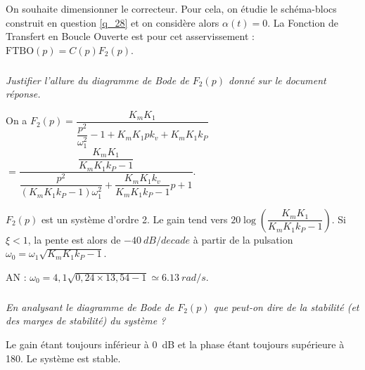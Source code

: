 \documentclass[10pt,fleqn]{article} %
\begin{document}
On souhaite dimensionner le correcteur. Pour cela, on étudie le schéma-blocs construit en question \ref{q_28} et on considère alors $\alpha(t)=0$. La Fonction de Transfert en Boucle Ouverte est pour cet asservissement : $\text{FTBO}(p)=C(p)F_2(p)$.

\subparagraph{\label{q_29}}\textit{Justifier l'allure du diagramme de Bode de $F_2(p)$ donné sur le document réponse.}
\ifprof
\begin{corrige}
On a $F_2(p)= \dfrac{K_m K_1}{\dfrac{p^2}{\omega_1^2}-1+K_m K_1pk_v+K_m K_1k_P}$
$ = \dfrac{\dfrac{K_m K_1}{K_m K_1k_P-1}}{\dfrac{p^2}{\left(K_m K_1k_P-1\right)\omega_1^2}+\dfrac{K_m K_1k_v}{K_m K_1k_P-1}p+1}$.

$F_2(p)$ est un système d'ordre 2. 
Le gain tend vers $20\log \left(\dfrac{K_m K_1}{K_m K_1k_P-1}\right)$. Si $\xi<1$, la pente est alors 
de $-\SI{40}{dB/decade}$ à partir de la pulsation $\omega_0 = \omega_1\sqrt{K_m K_1k_P-1}$.

AN : $\omega_0 = 4,1\sqrt{0,24 \times 13,54-1} \simeq \SI{6,13}{rad/s}$.


\end{corrige}
\else
\fi


\subparagraph{\label{q_29_a}}\textit{En analysant le diagramme de Bode de $F_2(p)$ que peut-on dire de la stabilité (et des marges de stabilité) du système ?}
\ifprof
\begin{corrige}
Le gain étant toujours inférieur à \SI{0}{dB} et la phase étant toujours supérieure à 180\degres. Le système est stable.
\end{corrige}
\else
\fi
\end{document}
